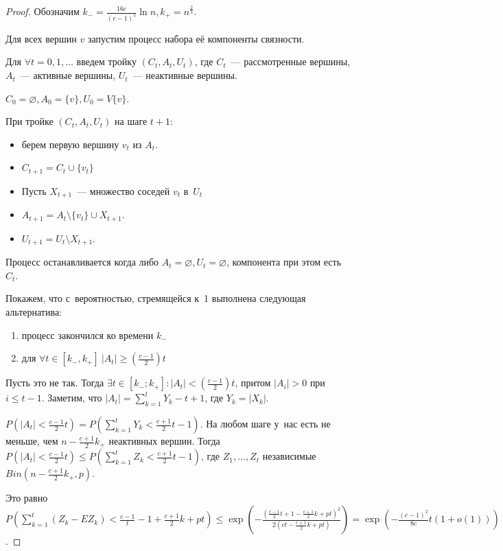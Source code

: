 \documentclass{article}
\begin{document}
\begin{proof}
	Обозначим $k_- = \frac{16c}{(c-1)^2} \ln n, k_+ = n^\frac{2}{3}$.

	Для всех вершин $v$ запустим процесс набора её компоненты связности.

	Для $\forall t=0, 1, \ldots$ введем тройку $(C_t, A_t, U_t)$, где $C_t$~--- рассмотренные вершины,
	$A_t$~--- активные вершины, $U_t$~--- неактивные вершины.

	$C_0 = \varnothing, A_0 = \{v\}, U_0 = V \{ v \}$.

	При тройке $(C_t, A_t, U_t)$ на шаге $t+1$:
	\begin{itemize}
		\item берем первую вершину $v_t$ из $A_t$.
		\item $C_{t+1} = C_t \cup \{v_t\}$
		\item Пусть $X_{t+1}$~--- множество соседей $v_t$ в~$U_t$
		\item $A_{t+1} = A_t \setminus \{v_t\} \cup X_{t+1}$.
		\item $U_{t+1} = U_t \setminus X_{t+1}$.
	\end{itemize}

	Процесс останавливается когда либо $A_t = \varnothing, U_t = \varnothing$, компонента при этом
	есть $C_t$.

	Покажем, что с~вероятностью, стремящейся к~1 выполнена следующая альтернатива:
	\begin{enumerate}
		\item процесс закончился ко времени $k_-$
		\item для $\forall t \in [k_-, k_+]\ |A_t| \ge \left(\frac{c-1}{2}\right)t$
	\end{enumerate}

	Пусть это не так. Тогда $\exists t \in [k_-; k_+]: |A_t| < \left(\frac{c-1}{2}\right)t$, притом
	$|A_i| > 0$ при $i \le t - 1$. Заметим, что $|A_t| = \sum\limits_{k=1}^t Y_k - t + 1$, где
	$Y_k = |X_k|$.

	$P(|A_t| < \frac{c-1}{2}t) = P(\sum\limits_{k=1}^t Y_k < \frac{c+1}{2}t - 1)$. На любом шаге у~нас
	есть не меньше, чем $n - \frac{c+1}{2}k_+$ неактивных вершин. Тогда $P(|A_t| < \frac{c-1}{2}t) \le
	P(\sum\limits_{k=1}^t Z_k < \frac{c+1}{2}t - 1)$, где $Z_1, \ldots, Z_t$ независимые $Bin(n -
	\frac{c + 1}{2}k_+, p)$.

	Это равно $P(\sum\limits_{k=1}^t (Z_k - EZ_k) < \frac{c-1}{t} - 1 + \frac{c+1}{2}k + pt) \le
	\exp\left(-\frac{(\frac{c-1}{2}t + 1 - \frac{c+1}{2}k + pt)^2}{2(ct - \frac{c+1}{2}k + pt)}\right)
	= \exp\left(-\frac{(c-1)^2}{8c} t(1 + o(1))\right)$.


\end{proof}
\end{document}
